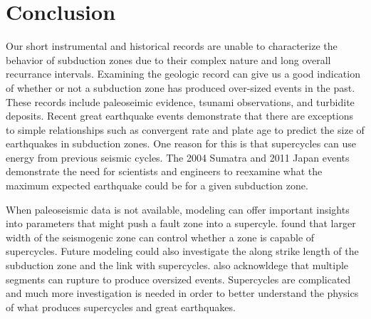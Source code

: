 \documentclass[]{proposalnsf}
\begin{document}
\section{Conclusion}
Our short instrumental and historical records are unable to characterize the behavior of subduction zones due to their complex nature and long overall recurrance intervals. Examining the geologic record can give us a good indication of whether or not a subduction zone has produced over-sized events in the past. These records include paleoseimic evidence, tsunami observations, and turbidite deposits. Recent great earthquake events demonstrate that there are exceptions to simple relationships such as convergent rate and plate age to predict the size of earthquakes in subduction zones. One reason for this is that supercycles can use energy from previous seismic cycles. The 2004 Sumatra and 2011 Japan events demonstrate the need for scientists and engineers to reexamine what the maximum expected earthquake could be for a given subduction zone. 

When paleoseismic data is not available, modeling can offer important insights into parameters that might push a fault zone into a supercyle. \citet{Herrendorfer2015} found that larger width of the seismogenic zone can control whether a zone is capable of supercycles. Future modeling could also investigate the along strike length of the subduction zone and the link with supercycles. \citet{Herrendorfer2015} also acknowldege that multiple segments can rupture to produce oversized events. Supercycles are complicated and much more investigation is needed in order to better understand the physics of what produces supercycles and great earthquakes.  






\newpage



\end{document}
